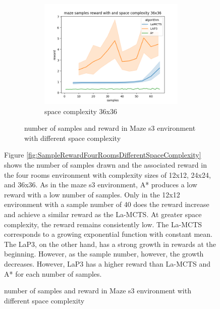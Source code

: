 \documentclass[bibliography=totoc]{scrartcl}
\begin{document}
\begin{figure}[H]
\begin{figure}[H]
	\begin{subfigure}[b]{0.3\linewidth}
		\includegraphics[width=\linewidth]{img/maze_samples__reward_b_8_LAP3_MCTS_AStar_interrupted_36.png}
        \caption{space complexity 36x36}
	\end{subfigure}
	\caption{number of samples and reward in Maze s3 environment with different space complexity}
	\label{fig:SampleRewardMazeDifferentSpaceComplexity}
\end{figure}

Figure \ref{fig:SampleRewardFourRoomsDifferentSpaceComplexity} shows the number of samples drawn and the associated reward in the four rooms environment with complexity sizes of 12x12, 24x24, and 36x36.
As in the maze s3 environment, A* produces a low reward with a low number of samples.
Only in the 12x12 environment with a sample number of 40 does the reward increase and achieve a similar reward as the \ac{La-MCTS}.
At greater space complexity, the reward remains consistently low.
The \ac{La-MCTS} corresponds to a growing exponential function with constant mean.
The \ac{LaP3}, on the other hand, has a strong growth in rewards at the beginning.
However, as the sample number, however, the growth decreases.
However, \ac{LaP3} has a higher reward than \ac{La-MCTS} and A* for each number of samples.


\end{figure}
\end{document}
